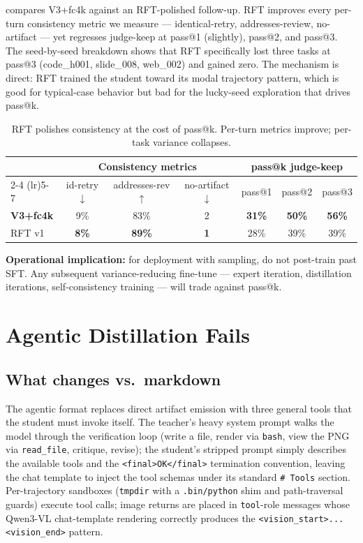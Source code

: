 \documentclass[11pt]{article}
\begin{document}
 compares V3+fc4k against an RFT-polished follow-up. RFT improves every per-turn consistency metric we measure --- identical-retry, addresses-review, no-artifact --- yet regresses judge-keep at pass@1 (slightly), pass@2, and pass@3. The seed-by-seed breakdown shows that RFT specifically lost three tasks at pass@3 (code\_h001, slide\_008, web\_002) and gained zero. The mechanism is direct: RFT trained the student toward its modal trajectory pattern, which is good for typical-case behavior but bad for the lucky-seed exploration that drives pass@k.

\begin{table}[t]
\centering
\caption{RFT polishes consistency at the cost of pass@k. Per-turn metrics improve; per-task variance collapses.}
\label{tab:rft-vs-passk}
\begin{tabular}{lcccccc}
\toprule
& \multicolumn{3}{c}{Consistency metrics} & \multicolumn{3}{c}{pass@k judge-keep} \\
\cmidrule(lr){2-4} \cmidrule(lr){5-7}
& id-retry $\downarrow$ & addresses-rev $\uparrow$ & no-artifact $\downarrow$ & pass@1 & pass@2 & pass@3 \\
\midrule
\textbf{V3+fc4k} & 9\% & 83\% & 2 & \textbf{31\%} & \textbf{50\%} & \textbf{56\%} \\
RFT v1 & \textbf{8\%} & \textbf{89\%} & \textbf{1} & 28\% & 39\% & 39\% \\
\bottomrule
\end{tabular}
\end{table}

\textbf{Operational implication:} for deployment with sampling, do not post-train past SFT. Any subsequent variance-reducing fine-tune --- expert iteration, distillation iterations, self-consistency training --- will trade against pass@k.

\section{Agentic Distillation Fails}
\label{sec:agentic}

\subsection{What changes vs.\ markdown}

The agentic format replaces direct artifact emission with three general tools that the student must invoke itself. The teacher's heavy system prompt walks the model through the verification loop (write a file, render via \texttt{bash}, view the PNG via \texttt{read\_file}, critique, revise); the student's stripped prompt simply describes the available tools and the \texttt{<final>OK</final>} termination convention, leaving the chat template to inject the tool schemas under its standard \texttt{\# Tools} section. Per-trajectory sandboxes (\texttt{tmpdir} with a \texttt{.bin/python} shim and path-traversal guards) execute tool calls; image returns are placed in \texttt{tool}-role messages whose Qwen3-VL chat-template rendering correctly produces the \texttt{<vision\_start>...<vision\_end>} pattern.
\end{document}

